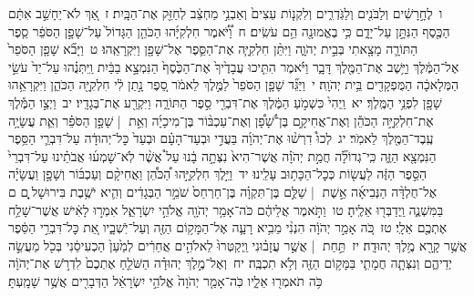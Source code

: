 \documentclass[18pt]{article}
\begin{document}
 {\loc ו~}לֶחָ֣רָשִׁ֔ים וְלַבֹּנִ֖ים וְלַגֹּֽדְרִ֑ים וְלִקְנ֤וֹת עֵצִים֙ וְאַבְנֵ֣י מַחְצֵ֔ב לְחַזֵּ֖ק אֶת־הַבָּֽיִת׃ \startlock
 {\loc ז~}אַ֚ךְ לֹא־יֵחָשֵׁ֣ב אִתָּ֔ם הַכֶּ֖סֶף הַנִּתָּ֣ן עַל־יָדָ֑ם כִּ֥י בֶאֱמוּנָ֖ה הֵ֥ם עֹשִֽׂים׃ \startlock
 {\loc ח~}וַ֠יֹּ֠אמֶר חִלְקִיָּ֜הוּ הַכֹּהֵ֤ן הַגָּדוֹל֙ עַל־שָׁפָ֣ן הַסֹּפֵ֔ר סֵ֧פֶר הַתּוֹרָ֛ה מָצָ֖אתִי בְּבֵ֣ית יְהֹוָ֑ה וַיִּתֵּ֨ן חִלְקִיָּ֧ה אֶת־הַסֵּ֛פֶר אֶל־שָׁפָ֖ן וַיִּקְרָאֵֽהוּ׃ \startlock
 {\loc ט~}וַיָּבֹ֞א שָׁפָ֤ן הַסֹּפֵר֙ אֶל־הַמֶּ֔לֶךְ וַיָּ֥שֶׁב אֶת־הַמֶּ֖לֶךְ דָּבָ֑ר וַיֹּ֗אמֶר הִתִּ֤יכוּ עֲבָדֶ֙יךָ֙ אֶת־הַכֶּ֙סֶף֙ הַנִּמְצָ֣א בַבַּ֔יִת וַֽיִּתְּנֻ֗הוּ עַל־יַד֙ עֹשֵׂ֣י הַמְּלָאכָ֔ה הַמֻּפְקָדִ֖ים בֵּ֥ית יְהֹוָֽה׃ \startlock
 {\loc י~}וַיַּגֵּ֞ד שָׁפָ֤ן הַסֹּפֵר֙ לַמֶּ֣לֶךְ לֵאמֹ֔ר סֵ֚פֶר נָ֣תַן לִ֔י חִלְקִיָּ֖ה הַכֹּהֵ֑ן וַיִּקְרָאֵ֥הוּ שָׁפָ֖ן לִפְנֵ֥י הַמֶּֽלֶךְ׃ \startlock
 {\loc יא~}וַֽיְהִי֙ כִּשְׁמֹ֣עַ הַמֶּ֔לֶךְ אֶת־דִּבְרֵ֖י סֵ֣פֶר הַתּוֹרָ֑ה וַיִּקְרַ֖ע אֶת־בְּגָדָֽיו׃ \startlock
 {\loc יב~}וַיְצַ֣ו הַמֶּ֡לֶךְ אֶת־חִלְקִיָּ֣ה הַכֹּהֵ֡ן וְאֶת־אֲחִיקָ֣ם בֶּן־שָׁ֠פָ֠ן וְאֶת־עַכְבּ֨וֹר בֶּן־מִיכָיָ֜ה וְאֵ֣ת  |  שָׁפָ֣ן הַסֹּפֵ֗ר וְאֵ֛ת עֲשָׂיָ֥ה עֶֽבֶד־הַמֶּ֖לֶךְ לֵאמֹֽר׃ \startlock
 {\loc יג~}לְכוּ֩ דִרְשׁ֨וּ אֶת־יְהֹוָ֜ה בַּעֲדִ֣י וּבְעַד־הָעָ֗ם וּבְעַד֙ כׇּל־יְהוּדָ֔ה עַל־דִּבְרֵ֛י הַסֵּ֥פֶר הַנִּמְצָ֖א הַזֶּ֑ה כִּֽי־גְדוֹלָ֞ה חֲמַ֣ת יְהֹוָ֗ה אֲשֶׁר־הִיא֙ נִצְּתָ֣ה בָ֔נוּ עַל֩ אֲשֶׁ֨ר לֹֽא־שָׁמְע֜וּ אֲבֹתֵ֗ינוּ עַל־דִּבְרֵי֙ הַסֵּ֣פֶר הַזֶּ֔ה לַעֲשׂ֖וֹת כְּכׇל־הַכָּת֥וּב עָלֵֽינוּ׃ \startlock
 {\loc יד~}וַיֵּ֣לֶךְ חִלְקִיָּ֣הוּ הַ֠כֹּהֵ֠ן וַאֲחִיקָ֨ם וְעַכְבּ֜וֹר וְשָׁפָ֣ן וַעֲשָׂיָ֗ה אֶל־חֻלְדָּ֨ה הַנְּבִיאָ֜ה אֵ֣שֶׁת  |  שַׁלֻּ֣ם בֶּן־תִּקְוָ֗ה בֶּן־חַרְחַס֙ שֹׁמֵ֣ר הַבְּגָדִ֔ים וְהִ֛יא יֹשֶׁ֥בֶת בִּירוּשָׁל ַ֖͏ְם ם בַּמִּשְׁנֶ֑ה וַֽיְדַבְּר֖וּ אֵלֶֽיהָ׃ \startlock
 {\loc טו~}וַתֹּ֣אמֶר אֲלֵיהֶ֔ם כֹּה־אָמַ֥ר יְהֹוָ֖ה אֱלֹהֵ֣י יִשְׂרָאֵ֑ל אִמְר֣וּ לָאִ֔ישׁ אֲשֶׁר־שָׁלַ֥ח אֶתְכֶ֖ם אֵלָֽי׃ \startlock
 {\loc טז~}כֹּ֚ה אָמַ֣ר יְהֹוָ֔ה הִנְנִ֨י מֵבִ֥יא רָעָ֛ה אֶל־הַמָּק֥וֹם הַזֶּ֖ה וְעַל־יֹֽשְׁבָ֑יו אֵ֚ת כׇּל־דִּבְרֵ֣י הַסֵּ֔פֶר אֲשֶׁ֥ר קָרָ֖א מֶ֥לֶךְ יְהוּדָֽה׃ \startlock
 {\loc יז~}תַּ֣חַת  |  אֲשֶׁ֣ר עֲזָב֗וּנִי וַֽיְקַטְּרוּ֙ לֵאלֹהִ֣ים אֲחֵרִ֔ים לְמַ֙עַן֙ הַכְעִיסֵ֔נִי בְּכֹ֖ל מַעֲשֵׂ֣ה יְדֵיהֶ֑ם וְנִצְּתָ֧ה חֲמָתִ֛י בַּמָּק֥וֹם הַזֶּ֖ה וְלֹ֥א תִכְבֶּֽה׃ \startlock
 {\loc יח~}וְאֶל־מֶ֣לֶךְ יְהוּדָ֗ה הַשֹּׁלֵ֤חַ אֶתְכֶם֙ לִדְרֹ֣שׁ אֶת־יְהֹוָ֔ה כֹּ֥ה תֹאמְר֖וּ אֵלָ֑יו כֹּֽה־אָמַ֤ר יְהֹוָה֙ אֱלֹהֵ֣י יִשְׂרָאֵ֔ל הַדְּבָרִ֖ים אֲשֶׁ֥ר שָׁמָֽעְתָּ׃ \startlock
\end{document}
